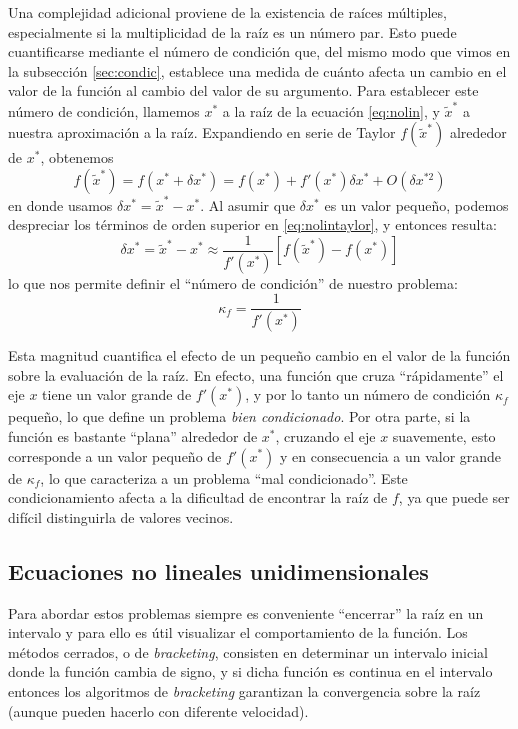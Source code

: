 Una complejidad adicional proviene de la existencia de raíces múltiples, especialmente si la multiplicidad de la raíz es un número par. Esto puede cuantificarse mediante el número de condición que, del mismo modo que vimos en la subsección \ref{sec:condic}, establece una medida de cuánto afecta un cambio en el valor de la función al cambio del valor de su argumento. Para establecer este número de condición, llamemos $x^*$ a la raíz de la ecuación \eqref{eq:nolin}, y $\tilde{x}^*$ a nuestra aproximación a la raíz. Expandiendo en serie de Taylor  $f(\tilde{x}^*)$ alrededor de $x^*$, obtenemos
\begin{equation}\label{eq:nolintaylor}
 f(\tilde{x}^*) = f(x^* + \delta x^*) = f(x^*) + f'(x^*) \delta x^* + O \left(\delta x^{*2} \right)
\end{equation} 
en donde usamos $\delta x^* = \tilde{x}^* - x^*$. Al asumir que $\delta x^*$ es un valor pequeño, podemos despreciar los términos de orden superior en \eqref{eq:nolintaylor}, y entonces resulta:
\begin{equation}
 \delta x^* = \tilde{x}^* - x^* \approx \frac{1}{f'(x^*)} \left[ f(\tilde{x}^*) - f(x^*) \right]
\end{equation} 
lo que nos permite definir el ``número de condición'' de nuestro problema:
\begin{equation}\label{eq:sisnolincond}
 \kappa_f = \frac{1}{f'(x^*)}
\end{equation} 

Esta magnitud cuantifica el efecto de un pequeño cambio en el valor de la función sobre la evaluación de la raíz. En efecto, una función que cruza ``rápidamente'' el eje $x$ tiene un valor grande de $f'(x^*)$, y por lo tanto un número de condición $\kappa_f$ pequeño, lo que define un problema \textit{bien condicionado}. Por otra parte, si la función es bastante ``plana'' alrededor de $x^*$, cruzando el eje $x$ suavemente, esto corresponde a un valor pequeño de $f'(x^*)$ y en consecuencia a un valor grande de $\kappa_f$, lo que caracteriza a un problema ``mal condicionado''. Este condicionamiento afecta a la dificultad de encontrar la raíz de $f$, ya que puede ser difícil distinguirla de valores vecinos. 

\subsection{Ecuaciones no lineales unidimensionales} \label{sec:nolinunidimensional}
Para abordar estos problemas siempre es conveniente ``encerrar'' la raíz en un intervalo y para ello es útil visualizar el comportamiento de la función. Los métodos cerrados, o de \textit{bracketing}, consisten en determinar un intervalo inicial donde la función cambia de signo, y si dicha función es continua en el intervalo entonces los algoritmos de \textit{bracketing} garantizan la convergencia sobre la raíz (aunque pueden hacerlo con diferente velocidad). 

